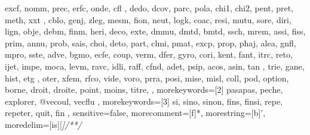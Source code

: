 {{      excf, nomm, prec, erfc, onde, cfl , dedo, dcov, parc,
      pola, chi1, chi2, pent, pret, meth, xxt , cblo, genj,
      zleg, mesm, fion, neut, logk, coac, resi, mutu, sore,
      diri, lign, obje, debm, finm, heri, deco, exte, dmmu,
      dmtd, bmtd, ssch, mrem, assi, fiss, prim, annu, prob,
      sais, choi, deto, part, clmi, pmat, excp, prop, phaj,
      alea, gnfl, mpro, sste, adve, bgmo, ecfe, coup, verm,
      dfer, gyro, cori, kent, fant, itrc, reto, ijet, impe,
      moca, levm, ravc, idli, raff, cfnd, adet, psip, acos,
      asin, tan , trie, gane, hist, etg , oter, xfem, rfco,
      vide, voro, prra, posi, mise, misl, coll, pod,  
      option, borne, droit, droite, point, moins, titre,
  },
  morekeywords=[2]{  %
    pasapas, peche, explorer, @vecoul, vecflu
  },
  morekeywords=[3]{  %
    si, sino, sinon, fins, finsi, repe, repeter, quit, fin
  },
  sensitive=false, %
  morecomment=[f]*, %
  morestring=[b]', %
  moredelim=[is][\sffamily\slshape\color{blue}]{/*}{*/}
}
